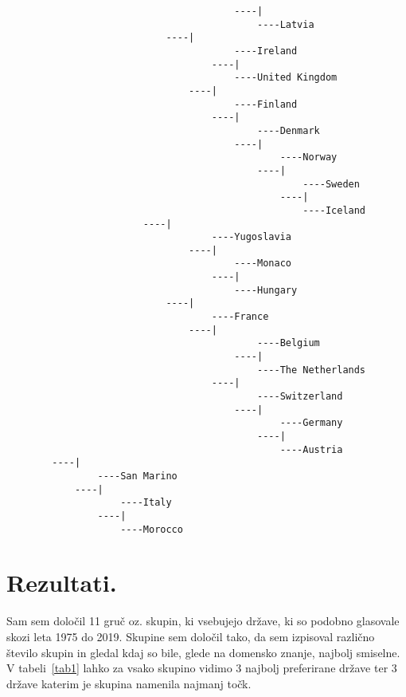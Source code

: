 \documentclass[a4paper,11pt]{article}
\begin{document}
\begin{lstlisting}
                                        ----|
                                            ----Latvia
                            ----|
                                        ----Ireland
                                    ----|
                                        ----United Kingdom
                                ----|
                                        ----Finland
                                    ----|
                                            ----Denmark
                                        ----|
                                                ----Norway
                                            ----|
                                                    ----Sweden
                                                ----|
                                                    ----Iceland
                        ----|
                                    ----Yugoslavia
                                ----|
                                        ----Monaco
                                    ----|
                                        ----Hungary
                            ----|
                                    ----France
                                ----|
                                            ----Belgium
                                        ----|
                                            ----The Netherlands
                                    ----|
                                            ----Switzerland
                                        ----|
                                                ----Germany
                                            ----|
                                                ----Austria
        ----|
                ----San Marino
            ----|
                    ----Italy
                ----|
                    ----Morocco

\end{lstlisting}

\newpage
\section{Rezultati.}

Sam sem določil 11 gruč oz. skupin, ki vsebujejo države, ki so podobno glasovale skozi leta 1975 do 2019. Skupine sem določil tako, da sem izpisoval različno število skupin in gledal kdaj so bile, glede na domensko znanje, najbolj smiselne. V tabeli~\ref{tab1} lahko za vsako skupino vidimo 3 najbolj preferirane države ter 3 države katerim je skupina namenila najmanj točk.
\end{document}
